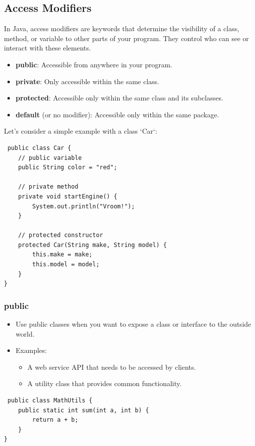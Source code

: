 \documentclass{book}
\begin{document}
\subsection{Access Modifiers}
In Java, access modifiers are keywords that determine the visibility of a class, method, or variable to other parts of your program. They control
who can see or interact with these elements.
\begin{itemize}

	\item \textbf{public}: Accessible from anywhere in your program.
	\item \textbf{private}: Only accessible within the same class.
	\item \textbf{protected}: Accessible only within the same class and its subclasses.
	\item \textbf{default} (or no modifier): Accessible only within the same package.
\end{itemize}
Let's consider a simple example with a class `Car`:
\begin{verbatim}
 public class Car {
    // public variable
    public String color = "red";

    // private method
    private void startEngine() {
        System.out.println("Vroom!");
    }

    // protected constructor
    protected Car(String make, String model) {
        this.make = make;
        this.model = model;
    }
}  
\end{verbatim}
\subsubsection{public}
\begin{itemize}
	\item Use public classes when you want to expose a class or interface to the outside world.
	\item Examples:
	      \begin{itemize}
		      \item  A web service API that needs to be accessed by clients.
		      \item  A utility class that provides common functionality.
	      \end{itemize}
\end{itemize}
\begin{verbatim}
 public class MathUtils {
    public static int sum(int a, int b) {
        return a + b;
    }
}  
\end{verbatim}
\end{document}
